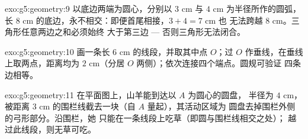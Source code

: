 \begin{solution}{exo:g5:geometry:9}
以底边两端为圆心，分别以 $3$ cm 与 $4$ cm 为半径所作的圆弧，
长 $8$ cm 的底边，永不相交：即便首尾相接，$3 + 4 = 7$ cm 也
无法跨越 $8$ cm。三角形任意两边之和必须始终
大于第三边 --- 否则三角形无法闭合。
\end{solution}

\begin{solution}{exo:g5:geometry:10}
画一条长 $6$ cm 的线段，并取其中点 $O$；过
$O$ 作垂线，在垂线上取两点，距离均为
$2$ cm（分居 $O$ 两侧）；依次连接四个端点。圆规可验证
四条边相等。
\end{solution}

\begin{solution}{exo:g5:geometry:11}
在平面图上，山羊能到达以 $A$ 为圆心的圆盘，
半径为 $4$ cm，被距离 $3$ cm 的围栏线截去一块（自 $A$ 量起），其活动区域为
圆盘去掉围栏外侧的弓形部分。沿围栏，她
只能在一条线段上吃草（即圆与围栏线相交之处）；
越过此线段，则无草可吃。
\end{solution}

